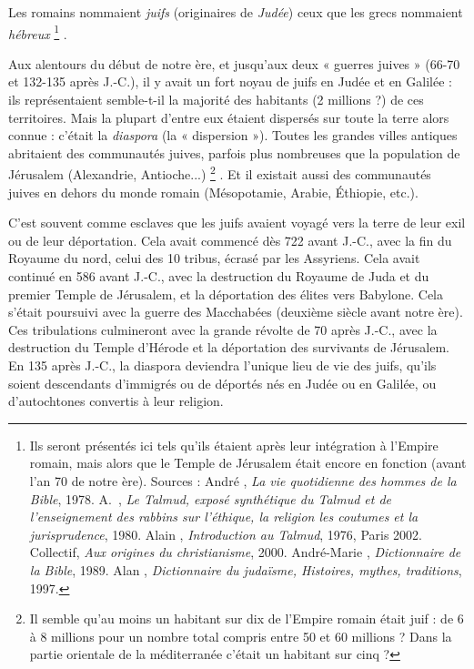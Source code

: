 
 Les romains nommaient \emph{juifs} (originaires de \emph{Judée}) ceux que les grecs nommaient \emph{hébreux}%
\footnote{Ils seront présentés ici tels qu'ils étaient après leur intégration à l'Empire romain, mais alors que le Temple de Jérusalem était encore en fonction (avant l'an 70 de notre ère).
Sources : André , \emph{La vie quotidienne des hommes de la Bible}, 1978. A.~, \emph{Le Talmud, exposé synthétique du Talmud et de l'enseignement des rabbins sur l'éthique, la religion les coutumes et la jurisprudence}, 1980. Alain , \emph{Introduction au Talmud}, 1976, Paris 2002. Collectif, \emph{Aux origines du christianisme}, 2000. André-Marie , \emph{Dictionnaire de la Bible}, 1989. Alan , \emph{Dictionnaire du judaïsme, Histoires, mythes, traditions}, 1997.}%
.

 Aux alentours du début de notre ère, et jusqu'aux deux « guerres juives » (\hbox{66-70} et \hbox{132-135} après J.-C.), il y avait un fort noyau de juifs en Judée et en Galilée : ils représentaient semble-t-il la majorité des habitants (2 millions ?) de ces territoires. Mais la plupart d'entre eux étaient dispersés sur toute la terre alors connue : c'était la \emph{diaspora} (la « dispersion »). Toutes les grandes villes antiques abritaient des communautés juives, parfois plus nombreuses que la population de Jérusalem (Alexandrie, Antioche...)%
\footnote{Il semble qu'au moins un habitant sur dix de l'Empire romain était juif : de 6 à 8 millions pour un nombre total compris entre 50 et 60 millions ? Dans la partie orientale de la méditerranée c'était un habitant sur cinq ?}%
. Et il existait aussi des communautés juives en dehors du monde romain (Mésopotamie, Arabie, Éthiopie, etc.).

 C'est souvent comme esclaves que les juifs avaient voyagé vers la terre de leur exil ou de leur déportation. Cela avait commencé dès 722 avant J.-C., avec la fin du Royaume du nord, celui des 10 tribus, écrasé par les Assyriens. Cela avait continué en 586 avant J.-C., avec la destruction du Royaume de Juda et du premier Temple de Jérusalem, et la déportation des élites vers Babylone. Cela s'était poursuivi avec la guerre des Macchabées (deuxième siècle avant notre ère). Ces tribulations culmineront avec la grande révolte de 70 après J.-C., avec la destruction du Temple d'Hérode et la déportation des survivants de Jérusalem. En 135 après J.-C., la diaspora deviendra l'unique lieu de vie des juifs, qu'ils soient descendants d'immigrés ou de déportés nés en Judée ou en Galilée, ou d'autochtones convertis à leur religion. 

